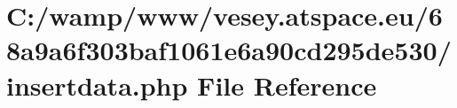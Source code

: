 \hypertarget{68a9a6f303baf1061e6a90cd295de530_2insertdata_8php}{\section{C\-:/wamp/www/vesey.atspace.\-eu/68a9a6f303baf1061e6a90cd295de530/insertdata.php File Reference}
\label{68a9a6f303baf1061e6a90cd295de530_2insertdata_8php}
}
